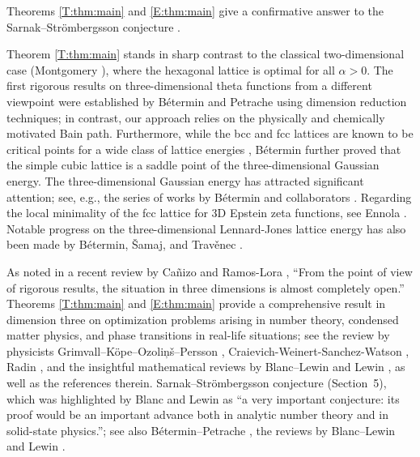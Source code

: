 \documentclass[reqno,english]{amsart}
\theoremstyle{definition}
\newtheorem{open problem}[theorem]{Open Problem}
\theoremstyle{remark}
\theoremstyle{plain}
\numberwithin{equation}{section}
\begin{document}
Theorems \ref{T:thm:main} and \ref{E:thm:main} give a confirmative answer to  the
Sarnak--Str\"{o}mbergsson conjecture \cite[Inequalities (43)--(44), Section 5]{SS}.


Theorem \ref{T:thm:main} stands in sharp contrast to the classical two-dimensional case (Montgomery \cite{Mon1988}), where the hexagonal lattice is optimal for all $\alpha>0$.
 The first rigorous results on three-dimensional theta functions from a different viewpoint were established by B\'etermin and Petrache \cite{Betermin2017} using dimension reduction techniques; in contrast, our approach relies on the physically and chemically motivated Bain path. Furthermore, while the bcc and fcc lattices are known to be critical points for a wide class of lattice energies \cite{Betermin2019}, B\'etermin \cite{Betermin2019} further proved that the simple cubic lattice is a saddle point of the three-dimensional Gaussian energy. The three-dimensional Gaussian energy has attracted significant attention; see, e.g., the series of works by B\'etermin and collaborators \cite{Betermin2019b, Betermin2021M3AS, Betermin2021AHP, Betermin2021JPA, Betermin2021LMP}. Regarding the local minimality of the fcc lattice for 3D Epstein zeta functions, see Ennola \cite{Ennola}.
Notable progress on the three-dimensional Lennard-Jones lattice energy has also been made by B\'etermin, \v{S}amaj, and Trav\v{e}nec \cite{Betermin2023SAM}.

As noted in a recent review by Ca\~{n}izo and Ramos-Lora \cite{Canizo2024}, ``From the point of view of rigorous results, the situation in three dimensions is almost completely open.''
Theorems \ref{T:thm:main} and \ref{E:thm:main} provide a comprehensive result in dimension three on optimization problems arising in number theory, condensed matter physics, and phase transitions in real-life situations; see the review by physicists Grimvall--K\"{o}pe--Ozoli\c{n}\v{s}--Persson \cite{Gri2012}, Craievich-Weinert-Sanchez-Watson \cite{Crai1994}, Radin \cite{Radin1987, Radin1991}, and the insightful mathematical reviews by Blanc--Lewin \cite{Bla2015} and Lewin \cite{Lewin2022}, as well as the references therein.
Sarnak--Str\"{o}mbergsson conjecture \cite{SS} (Section~5), which was
highlighted by Blanc and Lewin \cite{Bla2015} as ``a very
important conjecture: its proof would be an important advance both in analytic number
theory and in solid-state physics.''; see also B\'{e}termin--Petrache \cite{Betermin2017}, the reviews by Blanc--Lewin \cite{Bla2015} and Lewin \cite{Lewin2022,Lewin2025}.
\end{document}
